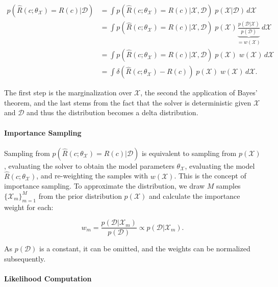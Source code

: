 \begin{align*}
p(\hat{R}(c;\theta_{\mathcal{X}}) = R(c)| \mathcal{D}) &= \int p(\hat{R}(c;\theta_{\mathcal{X}}) = R(c) | \mathcal{X}, \mathcal{D})\; p(\mathcal{X} | \mathcal{D}) \, d\mathcal{X} \\
                                          &= \int p(\hat{R}(c;\theta_{\mathcal{X}}) = R(c) | \mathcal{X}, \mathcal{D})\; p(\mathcal{X}) \underbrace{\frac{p(\mathcal{D} | \mathcal{X}) }{p(\mathcal{D})}}_{= w(\mathcal{X})} \, d\mathcal{X} \\
                                          &= \int p(\hat{R}(c;\theta_{\mathcal{X}}) = R(c) | \mathcal{X}, \mathcal{D})\; p(\mathcal{X})\; w(\mathcal{X}) \, d\mathcal{X} \\
                                          &= \int \delta(\hat{R}(c;\theta_{\mathcal{X}}) - R(c))\; p(\mathcal{X})\; w(\mathcal{X}) \, d\mathcal{X} .
\end{align*}

The first step is the marginalization over $\mathcal{X}$, the second the application of Bayes' theorem, and the last stems from the fact that the solver is deterministic given $\mathcal{X}$ and $\mathcal{D}$ and thus the distribution becomes a delta distribution.


\paragraph{Importance Sampling}

Sampling from $p(\hat{R}(c;\theta_{\mathcal{X}}) = R(c)| \mathcal{D})$ is equivalent to sampling from $p(\mathcal{X})$, evaluating the solver to obtain the model parameters $\theta_{\mathcal{X}}$, evaluating the model $\hat{R}(c;\theta_{\mathcal{X}})$, and re-weighting the samples with $w(\mathcal{X})$. This is the concept of importance sampling. To approximate the distribution, we draw $M$ samples $\{\mathcal{X}_m\}_{m=1}^M$ from the prior distribution $p(\mathcal{X})$ and calculate the importance weight for each:

\begin{equation*}
w_m = \frac{p(\mathcal{D} | \mathcal{X}_m)}{p(\mathcal{D})} \propto p(\mathcal{D} | \mathcal{X}_m) .
\end{equation*}

As $p(\mathcal{D})$ is a constant, it can be omitted, and the weights can be normalized subsequently.


\paragraph{Likelihood Computation}

